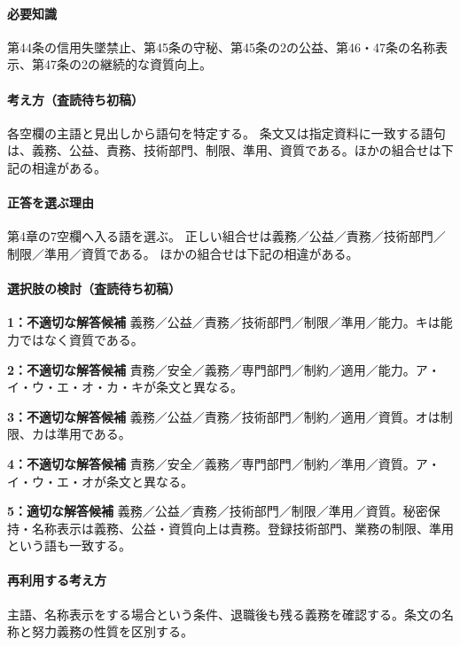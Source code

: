 \paragraph{必要知識} 第44条の信用失墜禁止、第45条の守秘、第45条の2の公益、第46・47条の名称表示、第47条の2の継続的な資質向上。

\paragraph{考え方（査読待ち初稿）} 各空欄の主語と見出しから語句を特定する。 条文又は指定資料に一致する語句は、義務、公益、責務、技術部門、制限、準用、資質である。ほかの組合せは下記の相違がある。

\paragraph{正答を選ぶ理由} 第4章の7空欄へ入る語を選ぶ。 正しい組合せは義務／公益／責務／技術部門／制限／準用／資質である。 ほかの組合せは下記の相違がある。

\paragraph{選択肢の検討（査読待ち初稿）}\mbox{}\par

\noindent\textbf{1：不適切な解答候補} 義務／公益／責務／技術部門／制限／準用／能力。キは能力ではなく資質である。\par

\noindent\textbf{2：不適切な解答候補} 責務／安全／義務／専門部門／制約／適用／能力。ア・イ・ウ・エ・オ・カ・キが条文と異なる。\par

\noindent\textbf{3：不適切な解答候補} 義務／公益／責務／技術部門／制約／適用／資質。オは制限、カは準用である。\par

\noindent\textbf{4：不適切な解答候補} 責務／安全／義務／専門部門／制約／準用／資質。ア・イ・ウ・エ・オが条文と異なる。\par

\noindent\textbf{5：適切な解答候補} 義務／公益／責務／技術部門／制限／準用／資質。秘密保持・名称表示は義務、公益・資質向上は責務。登録技術部門、業務の制限、準用という語も一致する。\par

\paragraph{再利用する考え方} 主語、名称表示をする場合という条件、退職後も残る義務を確認する。条文の名称と努力義務の性質を区別する。

